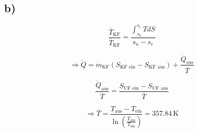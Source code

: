 

\subsection*{b)}

\[
\frac{\overline{T}_{\text{KF}}}{\overline{T}_{\text{KF}}} = \frac{\int_{s_a}^{s_e} T dS}{s_a - s_e}
\]

\[
\Rightarrow \dot{Q} = \dot{m}_{\text{KF}} (S_{\text{KF ein}} - S_{\text{KF aus}}) + \frac{\dot{Q}_{\text{aus}}}{\overline{T}}
\]

\[
\frac{\dot{Q}_{\text{aus}}}{\overline{T}} = \frac{S_{\text{UF ein}} - S_{\text{UF aus}}}{\overline{T}}
\]

\[
\Rightarrow \overline{T} = \frac{T_{\text{aus}} - T_{\text{ein}}}{\ln \left( \frac{T_{\text{aus}}}{T_{\text{ein}}} \right)} = 357.84 \, \text{K}
\]